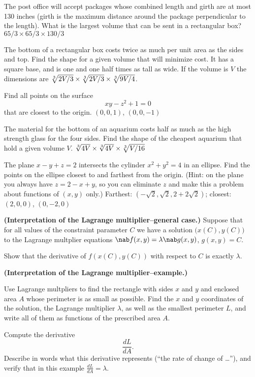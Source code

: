 \begin{multicols}{2}
\problem The post office will accept packages whose combined length and  
girth are at most 130 inches (girth is the maximum distance around the
package perpendicular to the length). What is the largest volume that can
be sent in a rectangular box? 
\answer  $65/3\times 65/3\times 130/3$  
\endanswer

\problem The bottom of a rectangular box costs twice as much per unit area  
as the sides and top. Find the shape for a given volume that will minimize
cost. 
\answer  It has a square base, and is one and one half times as tall  
as wide.  If the volume is $V$ the dimensions are $\root 3 \of {2V/3}\times
\root 3 \of {2V/3}\times \root 3\of {9V/4}$.
\endanswer


\problem Find all points on the surface  
$$xy-z^2+1=0$$
that are closest to the origin. 
\answer  $(0,0,1)$, $(0,0,-1)$  
\endanswer

\problem The material for the bottom of an aquarium costs half as much as  
the high strength glass for the four sides. Find the shape of the cheapest
aquarium that hold a given volume $V$. 
\answer  $\root 3\of{4V}\times\root  
3\of{4V}\times\root 3\of{V/16}$
\endanswer

\problem The plane $x-y+z=2$ intersects the cylinder $x^2+y^2=4$ in an  
ellipse. Find the points on the ellipse closest to and farthest from the
origin.  (Hint: on the plane you always have $z=2-x+y$, so you can
eliminate $z$ and make this a problem about functions of $(x,y)$ only.)
\answer  Farthest: $(-\sqrt2,\sqrt2,2+2\sqrt2)$; closest:  
$(2,0,0)$, $(0,-2,0)$
\endanswer

\problem \textbf{(Interpretation of the Lagrange multiplier--general case.)}%
\label{prb:lagrange-multiplier-interpretation-1}
Suppose that for all values of the constraint parameter $C$ we have a solution $\bigl(x(C), y(C)\bigr)$ to the Lagrange multplier equations $\nab f(x, y)=\lambda \nab g(x,y)$, $g(x,y)=C$.

Show that the derivative of $f(x(C), y(C))$ with respect to $C$ is exactly $\lambda$.

\problem \textbf{(Interpretation of the Lagrange multiplier--example.)}
\label{prb:lagrange-multiplier-interpretation-2}

\subprob Use Lagrange multpliers to find the rectangle with sides $x$ and $y$ and enclosed area $A$ whose perimeter is as small as possible.  Find the $x$ and $y$ coordinates of the solution, the Lagrange multiplier $\lambda$, as well as the smallest perimeter $L$, and write all of them as functions of the prescribed area $A$.

\subprob Compute the derivative 
\[
\frac{dL}{dA}.
\]
Describe in words what this derivative represents (``the rate of change of \dots''), and verify that in this example $\frac{dL}{dA} = \lambda$.

\end{multicols}
\noproblemfont


